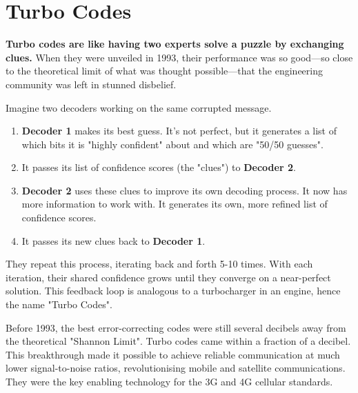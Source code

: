 
\chapter{Turbo Codes}
\label{ch:turbo-codes}

\begin{nontechnical}
    \textbf{Turbo codes are like having two experts solve a puzzle by exchanging clues.} When they were unveiled in 1993, their performance was so good—so close to the theoretical limit of what was thought possible—that the engineering community was left in stunned disbelief.

    Imagine two decoders working on the same corrupted message.
    \begin{enumerate}[label=\arabic*.]
        \item \textbf{Decoder 1} makes its best guess. It's not perfect, but it generates a list of which bits it is "highly confident" about and which are "50/50 guesses".
        \item It passes its list of confidence scores (the "clues") to \textbf{Decoder 2}.
        \item \textbf{Decoder 2} uses these clues to improve its own decoding process. It now has more information to work with. It generates its own, more refined list of confidence scores.
        \item It passes its new clues back to \textbf{Decoder 1}.
    \end{enumerate}
    They repeat this process, iterating back and forth 5-10 times. With each iteration, their shared confidence grows until they converge on a near-perfect solution. This feedback loop is analogous to a turbocharger in an engine, hence the name "Turbo Codes".

    Before 1993, the best error-correcting codes were still several decibels away from the theoretical "Shannon Limit". Turbo codes came within a fraction of a decibel. This breakthrough made it possible to achieve reliable communication at much lower signal-to-noise ratios, revolutionising mobile and satellite communications. They were the key enabling technology for the 3G and 4G cellular standards.
\end{nontechnical}


